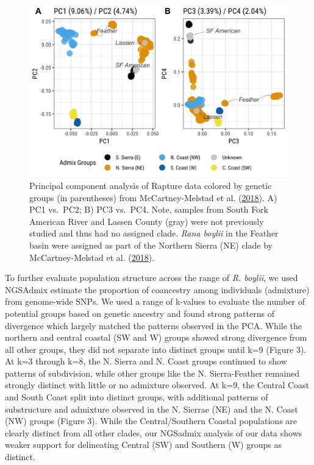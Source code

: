 \documentclass[proquest,12pt,final]{ucthesis-CA2012} %
\begin{document}
\begin{ucmainmatter}
\begin{figure}

{\centering \includegraphics[width=0.95\linewidth]{figure/ch3/fig_02_pca_12_34_all_rabo_filt10_1_100k_thresh_annot} 

}

\caption{Principal component analysis of Rapture data colored by
genetic groups (in parentheses) from McCartney-Melstad et al.
(\protect\hyperlink{ref-mccartney-melstad_population_2018}{2018}). A)
PC1 vs.~PC2; B) PC3 vs.~PC4. Note, samples from South Fork American
River and Lassen County (gray) were not previously studied and thus had
no assigned clade. \emph{Rana boylii} in the Feather basin were assigned
as part of the Northern Sierra (NE) clade by McCartney-Melstad et al.
(\protect\hyperlink{ref-mccartney-melstad_population_2018}{2018}).}\label{fig:CH3F2pca}
\end{figure}
\clearpage

To further evaluate population structure across the range of \emph{R.
boylii}, we used NGSAdmix estimate the proportion of coancestry among
individuals (admixture) from genome-wide SNPs. We used a range of
k-values to evaluate the number of potential groups based on genetic
ancestry and found strong patterns of divergence which largely matched
the patterns observed in the PCA. While the northern and central coastal
(SW and W) groups showed strong divergence from all other groups, they
did not separate into distinct groups until k=9 (Figure 3). At k=3
through k=8, the N. Sierra and N. Coast groups continued to show
patterns of subdivision, while other groups like the N. Sierra-Feather
remained strongly distinct with little or no admixture observed. At k=9,
the Central Coast and South Coast split into distinct groups, with
additional patterns of substructure and admixture observed in the N.
Sierrae (NE) and the N. Coast (NW) groups (Figure 3). While the
Central/Southern Coastal populations are clearly distinct from all other
clades, our NGSadmix analysis of our data shows weaker support for
delineating Central (SW) and Southern (W) groups as distinct.






\end{ucmainmatter}
\end{document}
